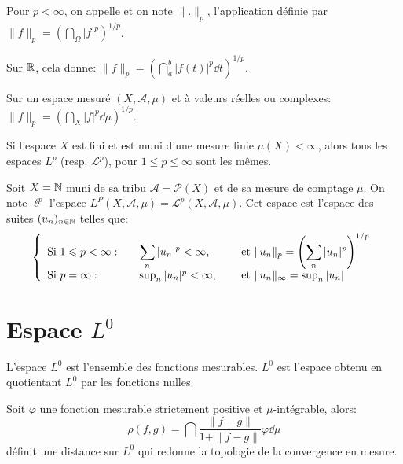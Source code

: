 \medskip
\begin{definition}[Norme $L^p$]
Pour $p<\infty$, on appelle  et on note $\|.\|_p$,
l'application définie par $\|f\|_p=\left(\dint_\Omega |f|^p\right)^{1/p}$.
\end{definition}

Sur $\mathbb R$, cela donne: $\|f\|_p=\left(\dint_a^b |f(t)|^p\dd t\right)^{1/p}$.

Sur un espace mesuré $(X, \mathcal{A}, \mu)$ et à valeurs réelles ou complexes: $\|f\|_p=\left(\dint_X |f|^p\dd\mu\right)^{1/p}$.

\medskip
\begin{theoreme}
Si l'espace $X$ est fini et est muni d'une mesure finie $\mu(X)<\infty$, alors tous les espaces $L^p$
(resp. $\mathcal{L}^p$), pour $1\le p\le \infty$ sont les mêmes.
\end{theoreme}

\begin{definition}
Soit $X=\mathbb N$ muni de sa tribu $\mathcal{A}=\mathcal{P}(X)$ et de sa mesure de comptage $\mu$.
On note $\ell^p$ l'espace $L^P(X,\mathcal{A},\mu)=\mathcal{L}^p(X,\mathcal{A},\mu)$.
Cet espace est l'espace des suites $(u_n)_{n\in\mathbb N}$ telles que:
\begin{equation}
\left\{
\begin{array}{lll}
\text{Si } 1\leqslant p<\infty: &\quad \displaystyle\sum_n |u_n|^p<\infty, &\quad \text{ et } \|u_n\|_p=\left(\displaystyle\sum_n|u_n|^p\right)^{1/p}\\
\text{Si } p=\infty: &\quad \sup_n |u_n|^p<\infty, &\quad \text{ et } \|u_n\|_\infty=\sup_n|u_n|
\end{array}
\right.
\end{equation}
\end{definition}

\medskip
\section{Espace $L^0$}
L'espace $L^0$ est l'ensemble des fonctions mesurables.
$L^0$ est l'espace obtenu en quotientant $L^0$ par les fonctions nulles.

\medskip
Soit $\varphi$ une fonction mesurable strictement positive et $\mu$-intégrable, alors:
\begin{equation}
\rho(f,g)=\dint \frac{\|f-g\|}{1+\|f-g\|} \varphi \dd\mu
\end{equation}
définit une distance sur $L^0$ qui redonne la topologie de la convergence en mesure.


